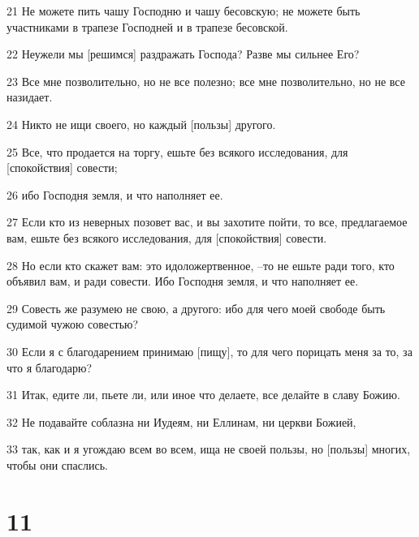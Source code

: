 \par 21 Не можете пить чашу Господню и чашу бесовскую; не можете быть участниками в трапезе Господней и в трапезе бесовской.
\par 22 Неужели мы [решимся] раздражать Господа? Разве мы сильнее Его?
\par 23 Все мне позволительно, но не все полезно; все мне позволительно, но не все назидает.
\par 24 Никто не ищи своего, но каждый [пользы] другого.
\par 25 Все, что продается на торгу, ешьте без всякого исследования, для [спокойствия] совести;
\par 26 ибо Господня земля, и что наполняет ее.
\par 27 Если кто из неверных позовет вас, и вы захотите пойти, то все, предлагаемое вам, ешьте без всякого исследования, для [спокойствия] совести.
\par 28 Но если кто скажет вам: это идоложертвенное, --то не ешьте ради того, кто объявил вам, и ради совести. Ибо Господня земля, и что наполняет ее.
\par 29 Совесть же разумею не свою, а другого: ибо для чего моей свободе быть судимой чужою совестью?
\par 30 Если я с благодарением принимаю [пищу], то для чего порицать меня за то, за что я благодарю?
\par 31 Итак, едите ли, пьете ли, или иное что делаете, все делайте в славу Божию.
\par 32 Не подавайте соблазна ни Иудеям, ни Еллинам, ни церкви Божией,
\par 33 так, как и я угождаю всем во всем, ища не своей пользы, но [пользы] многих, чтобы они спаслись.

\chapter{11}


